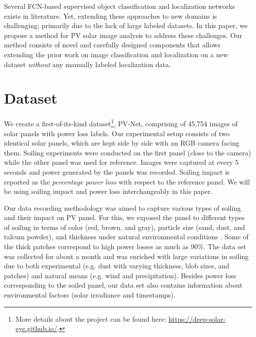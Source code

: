 \documentclass[10pt,twocolumn,letterpaper]{article}
\begin{document}
Several FCN-based supervised object classification and localization networks exists in literature. Yet, extending these approaches to new domains is challenging; primarily due to the lack of large labeled datasets. In this paper, we propose a method for PV solar image analysis to address these challenges. Our method consists of novel and carefully designed components that allows extending the prior work on image classification and localization on a new dataset \textit{without} any manually labeled localization data. 

\vspace{-2mm}
\section{Dataset}
\vspace{-2mm}
We create a first-of-its-kind dataset\footnote{More details about the project can be found here: \url{https://deep-solar-eye.github.io/}.}, PV-Net, comprising of 45,754 images of solar panels with power loss labels. Our experimental setup consists of two identical solar panels, which are kept side by side with an RGB camera facing them. Soiling experiments were conducted on the first panel (close to the camera) while the other panel was used for reference. Images were captured at every 5 seconds and power generated by the panels was recorded. Soiling impact is reported as the \textit{percentage power loss} with respect to the reference panel. We will be using soiling impact and power loss interchangeably in this paper.

Our data recording methodology was aimed to capture various types of soiling and their impact on PV panel. For this, we exposed the panel to different types of soiling in terms of color (red, brown, and gray), particle size (sand, dust, and talcum powder), and thickness under natural environmental conditions \cite{DustReview}. Some of the thick patches correspond to high power losses as much as 90\%. The data set was collected for about a month and was enriched with large variations in soiling due to both experimental (e.g. dust with varying thickness, blob sizes, and patches) and natural means (e.g. wind and precipitation). Besides power loss corresponding to the soiled panel, our data set also contains information about environmental factors (solar irradiance and timestamps).

\vspace{-2mm}
\end{document}
